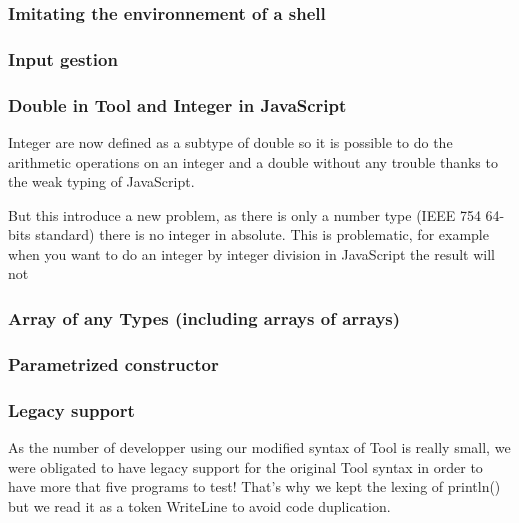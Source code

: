 \subsubsection{Imitating the environnement of a shell}
\subsubsection{Input gestion}


\subsubsection{Double in Tool and Integer in JavaScript}
Integer are now defined as a subtype of double so it is possible to do the arithmetic operations on an integer and a double without any trouble thanks to the weak typing of JavaScript.

But this introduce a new problem, as there is only a number type (IEEE 754 64-bits standard) there is no integer in absolute. This is problematic, for example when you want to do an integer by integer division
in JavaScript the result will not  

\subsubsection{Array of any Types (including arrays of arrays)}

\subsubsection{Parametrized constructor}

\subsubsection{Legacy support}
As the number of developper using our modified syntax of Tool is really small, we were obligated to have legacy support for the original Tool syntax in order to have more that five programs to test!
That's why we kept the lexing of println() but we read it as a token WriteLine to avoid code duplication.


